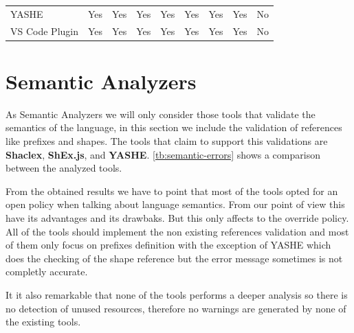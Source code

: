 \begin{table}
{\begin{tabular}{lcccccccc}
    YASHE          & Yes                                   & Yes                                 & Yes                             & Yes                                  & Yes                                  & Yes                                & Yes                                 & No                                                                                   \\
    VS Code Plugin & Yes                                   & Yes                                 & Yes                             & Yes                                  & Yes                                  & Yes                                & Yes                                 & No                                                                                   \\
    \hline
    \end{tabular}}
\end{table}

\section{Semantic Analyzers}
As Semantic Analyzers we will only consider those tools that validate the semantics of the language, in this section we
include the validation of references like prefixes and shapes. The tools that claim to support this validations are
\textbf{Shaclex}, \textbf{ShEx.js}, and \textbf{YASHE}. \cref{tb:semantic-errors} shows a comparison between the analyzed tools.

From the obtained results we have to point that most of the tools opted for an open policy when talking about language semantics. From our
point of view this have its advantages and its drawbaks. But this only affects to the override policy. All of the tools should
implement the non existing references validation and most of them only focus on prefixes definition with the exception of
YASHE which does the checking of the shape reference but the error message sometimes is not completly accurate.

It it also remarkable that none of the tools performs a deeper analysis so there is no detection of unused resources, therefore
no warnings are generated by none of the existing tools.

